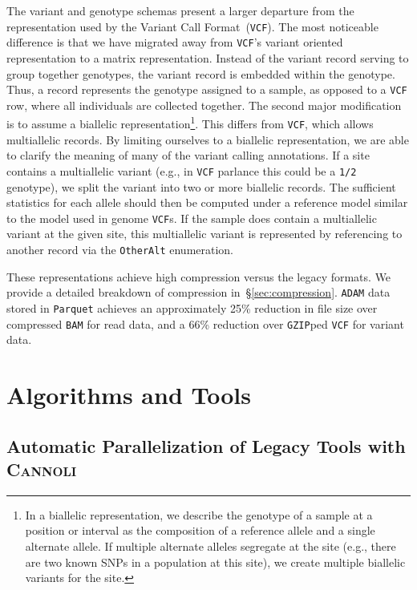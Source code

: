 \documentclass[phd]{ucbthesis}
\begin{document}
The variant and genotype schemas present a larger departure from the representation used by the Variant Call
Format~(\texttt{VCF}). The most noticeable difference is that we have migrated away from \texttt{VCF}'s variant oriented
representation to a matrix representation. Instead of the variant record serving to group together genotypes, the
variant record is embedded within the genotype. Thus, a record represents the genotype assigned to a sample,
as opposed to a \texttt{VCF} row, where all individuals are collected together. The second major modification is to assume
a biallelic representation\footnote{In a biallelic representation, we describe the genotype of a sample at a position or
interval as the composition of a reference allele and a single alternate allele. If multiple alternate alleles segregate at
the site (e.g., there are two known SNPs in a population at this site), we create multiple biallelic variants for the site.}.
This differs from \texttt{VCF}, which allows multiallelic records. By limiting
ourselves to a biallelic representation, we are able to clarify the meaning of many of the variant calling annotations. If a
site contains a multiallelic variant (e.g., in \texttt{VCF} parlance this could be a \texttt{1/2} genotype), we split the
variant into two or more biallelic records. The sufficient statistics for each allele should then be computed under
a reference model similar to the model used in genome \texttt{VCF}s. If the sample does contain a multiallelic variant at
the given site, this multiallelic variant is represented by referencing to another record via the \texttt{OtherAlt}
enumeration.

These representations achieve high compression versus the legacy formats. We provide a detailed breakdown of
compression in~\S\ref{sec:compression}. \texttt{ADAM} data stored in \texttt{Parquet} achieves an
approximately 25\% reduction in file size over compressed \texttt{BAM} for read data, and a 66\% reduction
over \texttt{GZIP}ped \texttt{VCF} for variant data.

\part{Algorithms and Tools}

\chapter{Automatic Parallelization of Legacy Tools with \textsc{Cannoli}}
\label{chap:cannoli}
\end{document}
